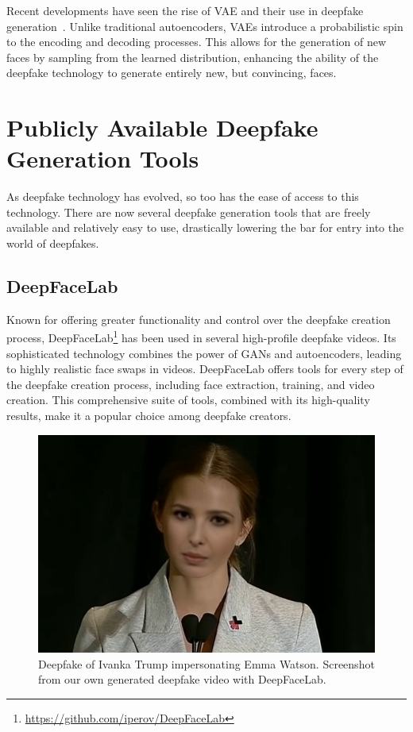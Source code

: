 Recent developments have seen the rise of \ac{VAE} and their use in deepfake
generation~\cite{kingma2022autoencoding}. Unlike traditional autoencoders, \ac{VAE}s introduce
a probabilistic spin to the encoding and decoding processes. This allows for the
generation of new faces by sampling from the learned distribution, enhancing the
ability of the deepfake technology to generate entirely new, but convincing, faces.

\section{Publicly Available Deepfake Generation Tools}\label{chapter:publicly}
As deepfake technology has evolved, so too has the ease of access to this technology.
There are now several deepfake generation tools that are freely available and relatively
easy to use, drastically lowering the bar for entry into the world of deepfakes.

\subsection{DeepFaceLab}
Known for offering greater functionality and control over the deepfake creation
process, DeepFaceLab\footnote{\url{https://github.com/iperov/DeepFaceLab}}
has been used in several high-profile deepfake videos.
Its sophisticated technology combines the power of \ac{GAN}s and autoencoders,
leading to highly realistic face swaps in videos. DeepFaceLab offers tools
for every step of the deepfake creation process, including face extraction,
training, and video creation. This comprehensive suite of tools, combined
with its high-quality results, make it a popular choice among deepfake creators.

\begin{figure}[hb]
	\centering
	\includegraphics[scale=0.36]{figures/ivanka-deepfacelab}
	\caption{Deepfake of Ivanka Trump impersonating Emma Watson. Screenshot
		from our own generated deepfake video with DeepFaceLab.} %
\end{figure}

